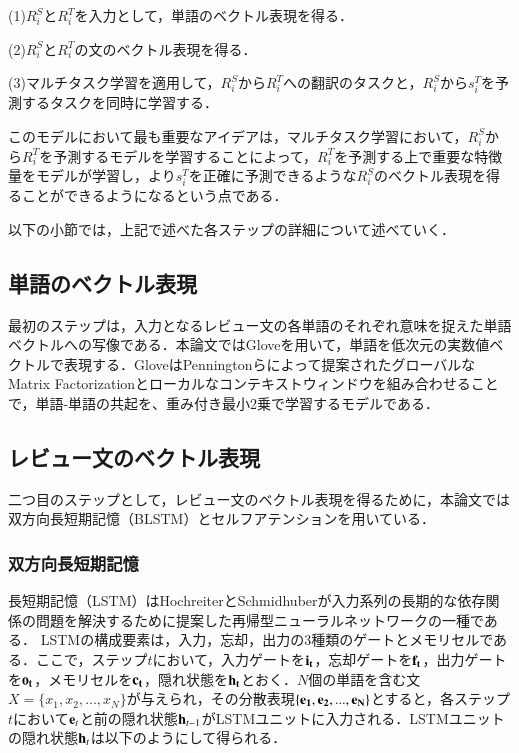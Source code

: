 \documentclass[dvipdfmx,twocolumn,10.5pt]{jsarticle}
\begin{document}
(1)$R^S_i$と$R^T_i$を入力として，単語のベクトル表現を得る．

(2)$R^S_i$と$R^T_i$の文のベクトル表現を得る．

(3)マルチタスク学習を適用して，$R^S_i$から$R^T_i$への翻訳のタスクと，$R^S_i$から$s_i^T$を予測するタスクを同時に学習する．

このモデルにおいて最も重要なアイデアは，マルチタスク学習において，$R^S_i$から$R^T_i$を予測するモデルを学習することによって，$R_i^T$を予測する上で重要な特徴量をモデルが学習し，より$s_i^T$を正確に予測できるような$R_i^S$のベクトル表現を得ることができるようになるという点である．

以下の小節では，上記で述べた各ステップの詳細について述べていく．

\subsection{単語のベクトル表現}\label{suggestion_create}
最初のステップは，入力となるレビュー文の各単語のそれぞれ意味を捉えた単語ベクトルへの写像である．本論文ではGlove\cite{pennington2014glove}を用いて，単語を低次元の実数値ベクトルで表現する．GloveはPenningtonらによって提案されたグローバルなMatrix Factorizationとローカルなコンテキストウィンドウを組み合わせることで，単語-単語の共起を、重み付き最小2乗で学習するモデルである．

\subsection{レビュー文のベクトル表現}\label{suggestion_create}
二つ目のステップとして，レビュー文のベクトル表現を得るために，本論文では双方向長短期記憶（BLSTM）とセルフアテンションを用いている．
\subsubsection{双方向長短期記憶}
長短期記憶（LSTM）はHochreiterとSchmidhuberが入力系列の長期的な依存関係の問題を解決するために提案した再帰型ニューラルネットワークの一種である．\cite{hochreiter1997long}
LSTMの構成要素は，入力，忘却，出力の3種類のゲートとメモリセルである．ここで，ステップ$t$において，入力ゲートを$\bf{i}_t$，忘却ゲートを$\bf{f}_t$，出力ゲートを$\bf{o}_t$，メモリセルを$\bf{c}_t$，隠れ状態を$\bf{h}_t$とおく．$N$個の単語を含む文$X=\{ x_1, x_2, ..., x_N \}$が与えられ，その分散表現$\{\bf{e}_1, \bf{e}_2, ..., {\bf e}_N \}$とすると，各ステップ$t$において${\bf e}_t$と前の隠れ状態${\bf h}_{t-1}$がLSTMユニットに入力される．LSTMユニットの隠れ状態${\bf h}_t$は以下のようにして得られる．
\end{document}
